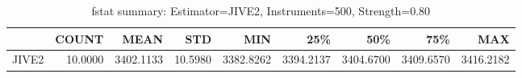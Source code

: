 \begin{table}[ht]
\centering
\caption{fstat summary: Estimator=JIVE2, Instruments=500, Strength=0.80}
\begin{tabular}{lrrrrrrrr}
\toprule
 & COUNT & MEAN & STD & MIN & 25\% & 50\% & 75\% & MAX \\
\midrule
JIVE2 & 10.0000 & 3402.1133 & 10.5980 & 3382.8262 & 3394.2137 & 3404.6700 & 3409.6570 & 3416.2182 \\
\bottomrule
\end{tabular}
\end{table}
